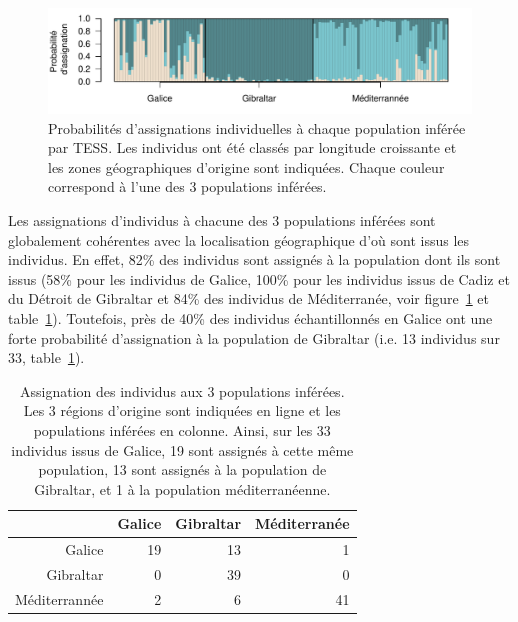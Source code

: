 \documentclass[a4paper,12pt,twoside]{article}\usepackage[]{graphicx}\usepackage[]{color}
\makeatletter
\def\maxwidth{ %
  \ifdim\Gin@nat@width>\linewidth
    \linewidth
  \else
    \Gin@nat@width
  \fi
}
\makeatother
\begin{document}
\begin{figure}[htpb]

{\centering \includegraphics[width=\maxwidth]{figure/barplot-1} 

}

\caption[Probabilités d'assignations individuelles à chaque population inférée par TESS]{Probabilités d'assignations individuelles à chaque population inférée par TESS. Les individus ont été classés par longitude croissante et les zones géographiques d'origine sont indiquées. Chaque couleur correspond à l'une des 3 populations inférées.}\label{fig:barplot}
\end{figure}



Les assignations d'individus à chacune des 3 populations inférées sont globalement cohérentes avec la localisation géographique d'où sont issus les individus. En effet, 82\% des individus sont assignés à la population dont ils sont issus (58\% pour les individus de Galice, 100\% pour les individus issus de Cadiz et du Détroit de Gibraltar et  84\% des individus de Méditerranée, voir figure~\ref{fig:barplot} et table~\ref{table:assignation}). Toutefois, près de 40\% des individus échantillonnés en Galice ont une forte probabilité d'assignation à la population de Gibraltar (i.e. 13 individus sur 33, table~\ref{table:assignation}).

\begin{table}[ht]
\centering
\caption[Assignation des individus aux 3 populations inférées.]{Assignation des individus aux 3 populations inférées. Les 3 régions d'origine sont indiquées en ligne et les populations inférées en colonne. Ainsi, sur les 33 individus issus de Galice, 19 sont assignés à cette même population, 13 sont assignés à la population de Gibraltar, et 1 à la population méditerranéenne.}
\label{table:assignation}
\begin{tabular}{rrrr}
  \toprule
 & Galice & Gibraltar & Méditerranée \\ 
  \midrule
Galice &  19 &  13 &   1 \\ 
  Gibraltar &   0 &  39 &   0 \\ 
  Méditerrannée &   2 &   6 &  41 \\ 
   \bottomrule
\end{tabular}
\end{table}
\end{document}
